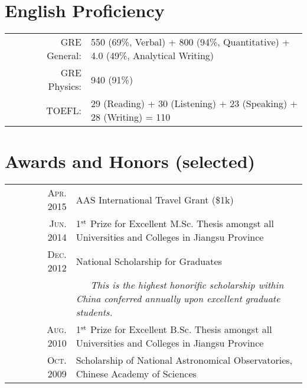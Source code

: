\documentclass[10pt]{article}
\begin{document}
\vspace{-1ex}
\section{English Proficiency}
\begin{tabular}{rl}
~~~~~GRE General:        & 550 (69\%, Verbal) + 800 (94\%, Quantitative) + 4.0 (49\%, Analytical Writing)    \\
~~~~~GRE Physics:        & 940 (91\%)    \\
~~~~~TOEFL:      &   29 (Reading) + 30 (Listening) + 23 (Speaking) + 28 (Writing) = 110
\end{tabular}

\section{Awards and Honors (selected)}
\begin{tabular}{rl}
~~~~~~\textsc{Apr. 2015} & AAS International Travel Grant (\$1k)    \\
~~~~~~\textsc{Jun. 2014} & 1$^{\rm st}$ Prize for Excellent M.Sc. Thesis amongst all Universities and Colleges in Jiangsu Province   \\
~~~~~~\textsc{Dec. 2012} & National Scholarship for Graduates   \\
& {\it\small ~~~This is the highest honorific scholarship within China conferred annually upon excellent graduate students.}\\
~~~~~~\textsc{Aug. 2010} & 1$^{\rm st}$ Prize for Excellent B.Sc. Thesis amongst all Universities and Colleges in Jiangsu Province   \\
~~~~~~\textsc{Oct. 2009} & Scholarship of National Astronomical Observatories, Chinese Academy of Sciences    \\
\end{tabular}

\end{document}
